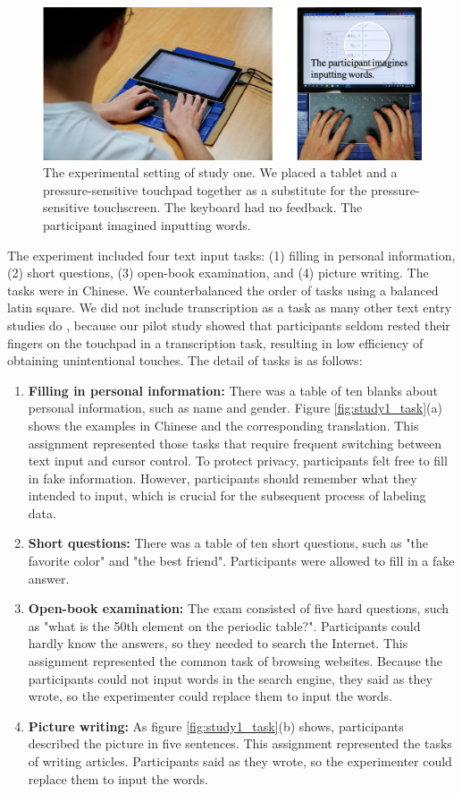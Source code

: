 \begin{figure}[!tbh]
	\includegraphics[width=0.9\linewidth]{figures/study1_illu.png}
	\centering
	\caption{The experimental setting of study one. We placed a tablet and a pressure-sensitive touchpad together as a substitute for the pressure-sensitive touchscreen. The keyboard had no feedback. The participant imagined inputting words.}
	\label{fig:study1_illu}
\end{figure}

The experiment included four text input tasks: (1) filling in personal information, (2) short questions, (3) open-book examination, and (4) picture writing. The tasks were in Chinese. We counterbalanced the order of tasks using a balanced latin square. We did not include transcription as a task as many other text entry studies do \cite{2003-Metrics, 2003-Phrase, 2017-Word}, because our pilot study showed that participants seldom rested their fingers on the touchpad in a transcription task, resulting in low efficiency of obtaining unintentional touches. The detail of tasks is as follows:

\begin{enumerate}
	\item{\textbf{Filling in personal information:} There was a table of ten blanks about personal information, such as name and gender. Figure \ref{fig:study1_task}(a) shows the examples in Chinese and the corresponding translation. This assignment represented those tasks that require frequent switching between text input and cursor control. To protect privacy, participants felt free to fill in fake information. However, participants should remember what they intended to input, which is crucial for the subsequent process of labeling data.}
	\item{\textbf{Short questions:} There was a table of ten short questions, such as "the favorite color" and "the best friend". Participants were allowed to fill in a fake answer.}
	\item{\textbf{Open-book examination:} The exam consisted of five hard questions, such as "what is the 50th element on the periodic table?". Participants could hardly know the answers, so they needed to search the Internet. This assignment represented the common task of browsing websites. Because the participants could not input words in the search engine, they said as they wrote, so the experimenter could replace them to input the words.}
	\item{\textbf{Picture writing:} As figure \ref{fig:study1_task}(b) shows, participants described the picture in five sentences. This assignment represented the tasks of writing articles. Participants said as they wrote, so the experimenter could replace them to input the words.}
\end{enumerate}


